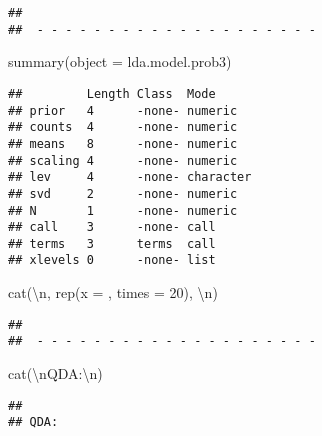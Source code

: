 \documentclass[
]{article}
\newenvironment{Shaded}{\begin{snugshade}}{\end{snugshade}}
\newcommand{\AttributeTok}[1]{\textcolor[rgb]{0.77,0.63,0.00}{#1}}
\newcommand{\DecValTok}[1]{\textcolor[rgb]{0.00,0.00,0.81}{#1}}
\newcommand{\FunctionTok}[1]{\textcolor[rgb]{0.00,0.00,0.00}{#1}}
\newcommand{\NormalTok}[1]{#1}
\newcommand{\SpecialCharTok}[1]{\textcolor[rgb]{0.00,0.00,0.00}{#1}}
\newcommand{\StringTok}[1]{\textcolor[rgb]{0.31,0.60,0.02}{#1}}
\begin{document}
\begin{verbatim}
## 
##  - - - - - - - - - - - - - - - - - - - -
\end{verbatim}

\begin{Shaded}
\begin{Highlighting}[]
\FunctionTok{summary}\NormalTok{(}\AttributeTok{object =}\NormalTok{ lda.model.prob3)}
\end{Highlighting}
\end{Shaded}

\begin{verbatim}
##         Length Class  Mode     
## prior   4      -none- numeric  
## counts  4      -none- numeric  
## means   8      -none- numeric  
## scaling 4      -none- numeric  
## lev     4      -none- character
## svd     2      -none- numeric  
## N       1      -none- numeric  
## call    3      -none- call     
## terms   3      terms  call     
## xlevels 0      -none- list
\end{verbatim}

\begin{Shaded}
\begin{Highlighting}[]
\FunctionTok{cat}\NormalTok{(}\StringTok{\textquotesingle{}}\SpecialCharTok{\textbackslash{}n}\StringTok{\textquotesingle{}}\NormalTok{, }\FunctionTok{rep}\NormalTok{(}\AttributeTok{x =} \StringTok{\textquotesingle{}{-}\textquotesingle{}}\NormalTok{, }\AttributeTok{times =} \DecValTok{20}\NormalTok{), }\StringTok{\textquotesingle{}}\SpecialCharTok{\textbackslash{}n}\StringTok{\textquotesingle{}}\NormalTok{)}
\end{Highlighting}
\end{Shaded}

\begin{verbatim}
## 
##  - - - - - - - - - - - - - - - - - - - -
\end{verbatim}

\begin{Shaded}
\begin{Highlighting}[]
\FunctionTok{cat}\NormalTok{(}\StringTok{\textquotesingle{}}\SpecialCharTok{\textbackslash{}n}\StringTok{QDA:}\SpecialCharTok{\textbackslash{}n}\StringTok{\textquotesingle{}}\NormalTok{)}
\end{Highlighting}
\end{Shaded}

\begin{verbatim}
## 
## QDA:
\end{verbatim}
\end{document}
